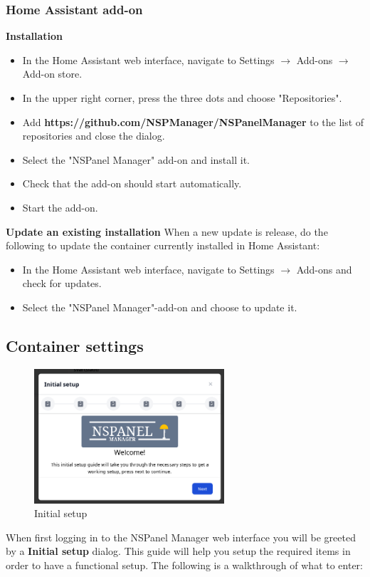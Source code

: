 \documentclass[10pt]{article}
\begin{document}
    \subsubsection{Home Assistant add-on}
    \textbf{Installation}
    \begin{itemize}
      \item In the Home Assistant web interface, navigate to Settings $\rightarrow$ Add-ons $\rightarrow$ Add-on store.
      \item In the upper right corner, press the three dots and choose "Repositories".
      \item Add \textbf{https://github.com/NSPManager/NSPanelManager} to the list of repositories and close the dialog.
      \item Select the "NSPanel Manager" add-on and install it.
      \item Check that the add-on should start automatically.
      \item Start the add-on.
    \end{itemize}
    \bigbreak
    \textbf{Update an existing installation}\newline
    When a new update is release, do the following to update the container currently installed in Home Assistant:
    \begin{itemize}
      \item In the Home Assistant web interface, navigate to Settings $\rightarrow$ Add-ons and check for updates.
      \item Select the "NSPanel Manager"-add-on and choose to update it.
    \end{itemize}


    \subsection{Container settings}
    \begin{figure}[H]
    \centering
    \includegraphics[height=5cm,keepaspectratio]{initial_setup_popup.png}
    \caption{Initial setup}%
    \end{figure}
    When first logging in to the NSPanel Manager web interface you will be greeted by a \textbf{Initial setup} dialog. This guide will help you setup the required items in order to have a functional setup.
    The following is a walkthrough of what to enter:
\end{document}

